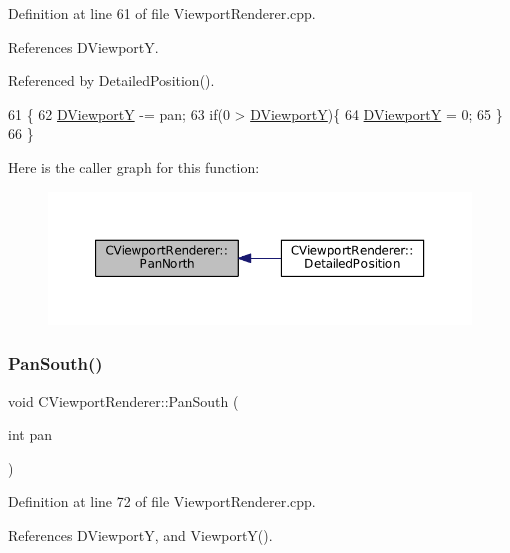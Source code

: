 Definition at line 61 of file Viewport\+Renderer.\+cpp.



References D\+ViewportY.



Referenced by Detailed\+Position().


\begin{DoxyCode}
61                                        \{
62     \hyperlink{classCViewportRenderer_ae13dd437a3da3d2bab16bc7ba61cb78f}{DViewportY} -= pan;
63     \textcolor{keywordflow}{if}(0 > \hyperlink{classCViewportRenderer_ae13dd437a3da3d2bab16bc7ba61cb78f}{DViewportY})\{
64         \hyperlink{classCViewportRenderer_ae13dd437a3da3d2bab16bc7ba61cb78f}{DViewportY} = 0;
65     \}
66 \}
\end{DoxyCode}
Here is the caller graph for this function\+:\nopagebreak
\begin{figure}[H]
\begin{center}
\leavevmode
\includegraphics[width=350pt]{classCViewportRenderer_a3dae20056eb4f9fc1c7d8238737ab290_icgraph}
\end{center}
\end{figure}
\hypertarget{classCViewportRenderer_ad4aa68d96923dbea1bfd9ae3f23a3132}{}\label{classCViewportRenderer_ad4aa68d96923dbea1bfd9ae3f23a3132} 
\subsubsection{\texorpdfstring{Pan\+South()}{PanSouth()}}
{\footnotesize\ttfamily void C\+Viewport\+Renderer\+::\+Pan\+South (\begin{DoxyParamCaption}\item[{int}]{pan }\end{DoxyParamCaption})}



Definition at line 72 of file Viewport\+Renderer.\+cpp.



References D\+ViewportY, and Viewport\+Y().



